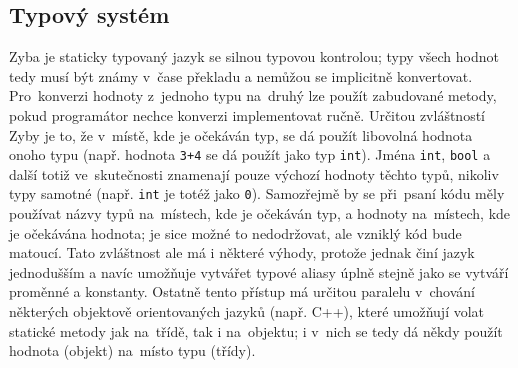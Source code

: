 \documentclass[a4paper,12pt]{article}
\begin{document}
\subsection{Typový systém}
Zyba je staticky typovaný jazyk se silnou typovou kontrolou; typy všech hodnot tedy musí být známy v~čase překladu a nemůžou se implicitně konvertovat. Pro~konverzi hodnoty z~jednoho typu na~druhý lze použít zabudované metody, pokud programátor nechce konverzi implementovat ručně. Určitou zvláštností Zyby je to, že v~místě, kde je očekáván typ, se dá použít libovolná hodnota onoho typu (např. hodnota \texttt{3+4} se dá použít jako typ \texttt{int}). Jména \texttt{int}, \texttt{bool} a další totiž ve~skutečnosti znamenají pouze výchozí hodnoty těchto typů, nikoliv typy samotné (např. \texttt{int} je totéž jako \texttt{0}). Samozřejmě by se při~psaní kódu měly používat názvy typů na~místech, kde je očekáván typ, a hodnoty na~místech, kde je očekávána hodnota; je sice možné to nedodržovat, ale vzniklý kód bude matoucí. Tato zvláštnost ale má i některé výhody, protože jednak činí jazyk jednodušším a navíc umožňuje vytvářet typové aliasy úplně stejně jako se vytváří proměnné a konstanty. Ostatně tento přístup má určitou paralelu v~chování některých objektově orientovaných jazyků (např. C++\cite{cpp}), které umožňují volat statické metody jak na~třídě, tak i na~objektu; i v~nich se tedy dá někdy použít hodnota (objekt) na~místo typu (třídy).
\end{document}
